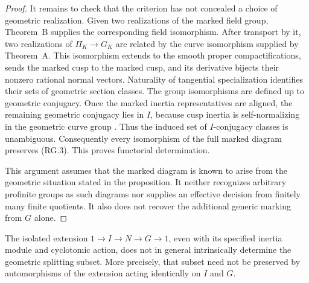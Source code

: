 \begin{proof}
It remains to check that the criterion has not concealed a choice
of geometric realization. Given two realizations of the marked
field group, Theorem~B supplies the corresponding field isomorphism.
After transport by it, two realizations of $\Pi_K\to G_K$ are
related by the curve isomorphism supplied by Theorem~A. This
isomorphism extends to the smooth proper compactifications, sends
the marked cusp to the marked cusp, and its derivative bijects
their nonzero rational normal vectors. Naturality of tangential
specialization identifies their sets of geometric section classes.
The group isomorphisms are defined up to geometric conjugacy.
Once the marked inertia representatives are aligned, the remaining
geometric conjugacy lies in $I$, because cusp inertia is
self-normalizing in the geometric curve group
\cite[Proposition~16, p.~8]{StixCuspidal2012}.
Thus the induced set of $I$-conjugacy classes is unambiguous.
Consequently every isomorphism of the full marked diagram
preserves (RG.3). This proves functorial determination.

This argument assumes that the marked diagram is known to arise
from the geometric situation stated in the proposition. It neither
recognizes arbitrary profinite groups as such diagrams nor supplies
an effective decision from finitely many finite quotients. It also
does not recover the additional generic marking from $G$ alone.
\end{proof}

\begin{proposition}
\label{prop:archive-bare-extension}
The isolated extension $1\to I\to N\to G\to1$, even with its
specified inertia module and cyclotomic action, does not in general
intrinsically determine the geometric splitting subset. More
precisely, that subset need not be preserved by automorphisms of
the extension acting identically on $I$ and $G$.
\end{proposition}

